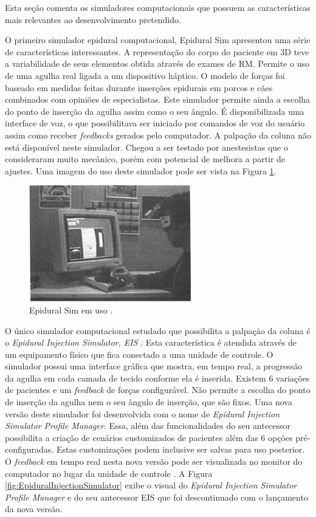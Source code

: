 Esta seção comenta os simuladores computacionais que possuem as características mais relevantes ao desenvolvimento pretendido.

O primeiro simulador epidural computacional, Epidural Sim \cite{Stredney1996} apresentou uma série de características interessantes. A representação do corpo do paciente em 3D teve a variabilidade de seus elementos obtida através de exames de \acrfull{RM}. Permite o uso de uma agulha real ligada a um dispositivo háptico. O modelo de forças foi baseado em medidas feitas durante inserções epidurais em porcos e cães combinados com opiniões de especialistas. Este simulador permite ainda a escolha do ponto de inserção da agulha assim como o seu ângulo. É disponibilizada uma interface de voz, o que possibilitava ser iniciado por comandos de voz do usuário assim como receber \textit{feedbacks} gerados pelo computador. A palpação da coluna não está disponível neste simulador. Chegou a ser testado por anestesistas que o consideraram muito mecânico, porém com potencial de melhora a partir de ajustes. Uma imagem do uso deste simulador pode ser vista na Figura \ref{fig:epiduralSim}. 

\begin{figure}[ht!]
    \centering
    \includegraphics[width=0.3\linewidth]{capitulos/figuras/epiduralSimulator.png} 
    \caption{Epidural Sim em uso \cite{Stredney1996}.}
    \label{fig:epiduralSim}
\end{figure}

O único simulador computacional estudado que possibilita a palpação da coluna é o \textit{Epidural Injection Simulator, EIS} \cite{Wilson2003}. Esta característica é atendida através de um equipamento físico que fica conectado a uma unidade de controle. O simulador possui uma interface gráfica que mostra, em tempo real, a progressão da agulha em cada camada de tecido conforme ela é inserida. Existem 6 variações de pacientes e um \textit{feedback} de forças configurável. Não permite a escolha do ponto de inserção da agulha nem o seu ângulo de inserção, que são fixos. Uma nova versão deste simulador foi desenvolvida com o nome de \textit{Epidural Injection Simulator Profile Manager}. Essa, além das funcionalidades do seu antecessor possibilita a criação de cenários customizados de pacientes além das 6 opções pré-configuradas. Estas customizações podem inclusive ser salvas para uso posterior. O \textit{feedback} em tempo real nesta nova versão pode ser visualizada no monitor do computador no lugar da unidade de controle \cite{CPRSavers&FirstAidSupply2018}. A Figura \ref{fig:EpiduralInjectionSimulator} exibe o visual do \textit{Epidural Injection Simulator Profile Manager} e do seu antecessor EIS que foi descontinuado com o lançamento da nova versão.

